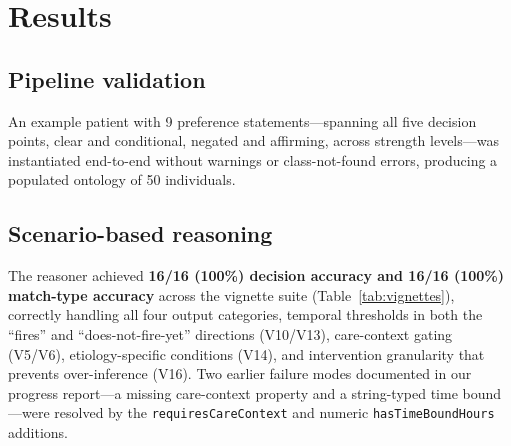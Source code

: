\documentclass[10pt]{article}
\newcommand{\onto}[1]{\texttt{\small #1}}
\begin{document}
\section{Results}

\subsection{Pipeline validation}
An example patient with 9 preference statements---spanning all five decision points, clear and conditional, negated and affirming, across strength levels---was instantiated end-to-end without warnings or class-not-found errors, producing a populated ontology of 50 individuals.

\subsection{Scenario-based reasoning}
The reasoner achieved \textbf{16/16 (100\%) decision accuracy and 16/16 (100\%) match-type accuracy} across the vignette suite (Table~\ref{tab:vignettes}), correctly handling all four output categories, temporal thresholds in both the ``fires'' and ``does-not-fire-yet'' directions (V10/V13), care-context gating (V5/V6), etiology-specific conditions (V14), and intervention granularity that prevents over-inference (V16). Two earlier failure modes documented in our progress report---a missing care-context property and a string-typed time bound---were resolved by the \onto{requiresCareContext} and numeric \onto{hasTimeBoundHours} additions.
\end{document}
